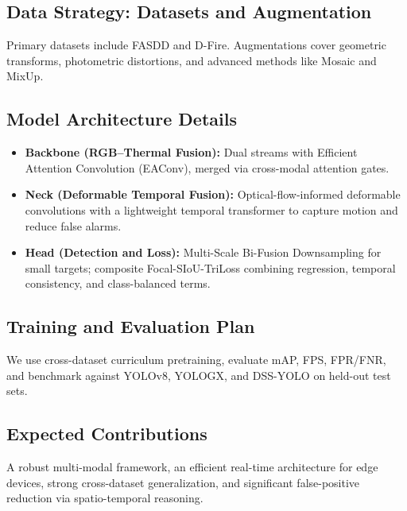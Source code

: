 \documentclass[12pt,a4paper]{article}
\begin{document}
\subsection{Data Strategy: Datasets and Augmentation}
Primary datasets include FASDD and D-Fire. Augmentations cover geometric transforms, photometric distortions, and advanced methods like Mosaic and MixUp.

\subsection{Model Architecture Details}
\begin{itemize}
  \item \textbf{Backbone (RGB--Thermal Fusion):} Dual streams with Efficient Attention Convolution (EAConv), merged via cross-modal attention gates.
  \item \textbf{Neck (Deformable Temporal Fusion):} Optical-flow-informed deformable convolutions with a lightweight temporal transformer to capture motion and reduce false alarms.
  \item \textbf{Head (Detection and Loss):} Multi-Scale Bi-Fusion Downsampling for small targets; composite Focal-SIoU-TriLoss combining regression, temporal consistency, and class-balanced terms.
\end{itemize}

\subsection{Training and Evaluation Plan}
We use cross-dataset curriculum pretraining, evaluate mAP, FPS, FPR/FNR, and benchmark against YOLOv8, YOLOGX, and DSS-YOLO on held-out test sets.

\subsection{Expected Contributions}
A robust multi-modal framework, an efficient real-time architecture for edge devices, strong cross-dataset generalization, and significant false-positive reduction via spatio-temporal reasoning.


\end{document}
